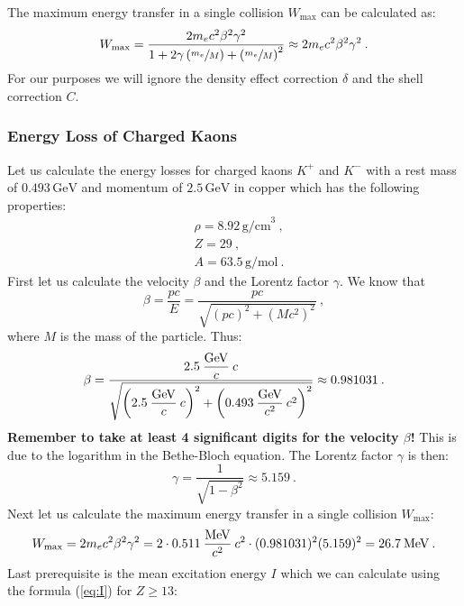 \documentclass[10pt, titlepage, a4paper]{article}
\numberwithin{equation}{section}
\begin{document}
The maximum energy transfer in a single collision $W_{\text{max}}$ can be calculated as:
%
\begin{equation}
    W_{\text{max}} = \frac{2m_e c^2\beta^2\gamma^2}{1 + 2\gamma \left(\sfrac{m_e}{M}\right) + \left(\sfrac{m_e}{M}\right)^2}\approx 2m_ec^2\beta^2\gamma^2\>.
    \label{eq:wmax}
\end{equation}
%
For our purposes we will ignore the density effect correction $\delta$ and the shell correction $C$.

\subsubsection{Energy Loss of Charged Kaons}
Let us calculate the energy losses for charged kaons $K^+$ and $K^-$ with a rest mass of $0.493\,\text{GeV}$ and momentum of $2.5\,\text{GeV}$ in copper which has the
following properties:
%
\begin{align*}
    & \rho = 8.92\,\text{g/cm}^3\>, \\
    & Z = 29\>, \\
    & A = 63.5\,\text{g/mol}\>.
\end{align*}
%
First let us calculate the velocity $\beta$ and the Lorentz factor $\gamma$. We know that
%
\begin{equation}
    \beta = \frac{pc}{E} = \frac{pc}{\sqrt{(pc)^2 + (Mc^2)^2}}\>,
    \label{eq:beta}
\end{equation}
%
where $M$ is the mass of the particle. Thus:
%
\begin{equation}
    \beta = \frac{2.5\>\dfrac{\rm{GeV}}{c}\>c}{\sqrt{\left(2.5\>\dfrac{\rm{GeV}}{c}\>c\right)^2 + {\left(0.493\>\dfrac{\rm{GeV}}{c^2}\>c^2\right)}^2}} \approx 0.981031\>.
\end{equation}
%
\textbf{Remember to take at least 4 significant digits for the velocity $\beta$!} This is due to the logarithm in the Bethe-Bloch equation.
The Lorentz factor $\gamma$ is then:
%
\begin{equation}
    \gamma = \frac{1}{\sqrt{1-\beta^2}} \approx 5.159\>.
\end{equation}
%
Next let us calculate the maximum energy transfer in a single collision $W_{\text{max}}$:
%
\begin{equation}
    W_{\text{max}} = 2m_ec^2\beta^2\gamma^2 = 2\cdot 0.511\>\frac{\rm{MeV}}{c^2}\>c^2\cdot(0.981031)^2(5.159)^2 = 26.7\>\text{MeV}\>.
\end{equation}
%
Last prerequisite is the mean excitation energy $I$ which we can calculate using the formula (\ref{eq:I}) for $Z \geq 13$:
\end{document}
